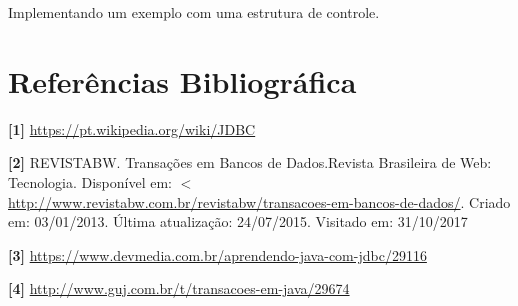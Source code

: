 \documentclass[12pt,a4paper]{article}
\begin{document}
Implementando um exemplo com uma estrutura de controle.






%


\newpage
\section{Referências Bibliográfica}
\noindent \textbf{[1] }\url{https://pt.wikipedia.org/wiki/JDBC}
\\\vspace{0.2cm}

\noindent\textbf{[2]} REVISTABW. Transações em Bancos de Dados.Revista Brasileira de Web: Tecnologia. Disponível em: $<$\url{http://www.revistabw.com.br/revistabw/transacoes-em-bancos-de-dados/}. Criado em: 03/01/2013. Última atualização: 24/07/2015. Visitado em: 31/10/2017 \\\vspace{0.2cm}

\noindent\textbf{[3]} \url{https://www.devmedia.com.br/aprendendo-java-com-jdbc/29116}
\\\vspace{0.2cm}

\noindent\textbf{[4]} \url{http://www.guj.com.br/t/transacoes-em-java/29674}
\end{document}
